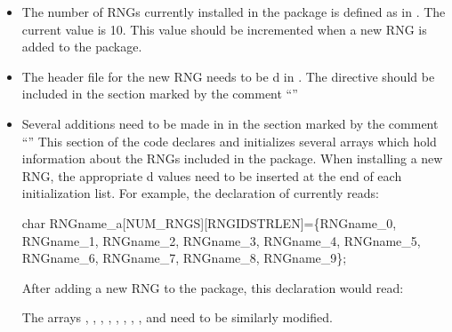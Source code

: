 \begin{itemize}
\item The number of RNGs currently installed in the package is defined as
 in .  The current value is 10.  This
value should be incremented when a new RNG is added to the package.
\item The header file for the new RNG needs to be d in
.  The  directive should be included in the
section marked by the comment ``''
\item Several additions need to be made in  in the
section marked by the comment ``''  This section of the code declares and initializes several
arrays which hold information about the RNGs included in the
package.
\pagebreak
When installing a new RNG, the appropriate d values need
to be inserted at the end of each initialization list.  For example, the
declaration of  currently reads:\\

\begin{example}
char RNGname\_a[NUM\_RNGS][RNGIDSTRLEN]=\{RNGname\_0, RNGname\_1,
      RNGname\_2, RNGname\_3, RNGname\_4, RNGname\_5, RNGname\_6,
      RNGname\_7, RNGname\_8, RNGname\_9\};\\
\end{example}
After adding a new RNG to the package, this declaration would read:\\
The arrays , , ,
, , , ,
, and  need to be similarly modified.
\end{itemize}

